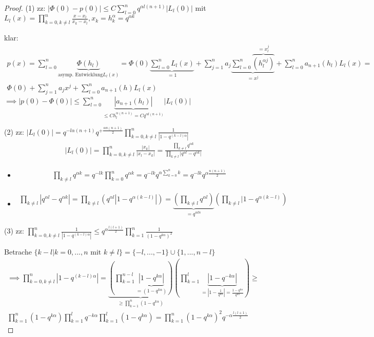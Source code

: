\begin{proof}
	(1) zz: $|\Phi(0) - p(0)| \leq C \sum_{l=0}^{n} q^{\alpha l (n+1)} |L_l(0)|$ mit $L_l(x) = \prod_{k=0, k\neq l}^{n} \frac{x-x_l}{x_k - x_l}, x_k = h_k^\alpha = q^{\alpha k}$
	
	klar:
	\begin{align*}
		p(x) = \sum_{l=0}^{n} \underbrace{\Phi(h_l)}_{\text{asymp. Entwicklung} L_l(x)} = \Phi(0) \underbrace{\sum_{l=0}^{n} L_l(x)}_{=1} + \sum_{j=1}^{n} a_j \underbrace{\sum_{l=0}^{n} \overbrace{(h_l^{\alpha j})}^{=x_l^j}}_{=x^j} + \sum_{l=0}^{n} a_{n+1}(h_l) L_l(x) =\\
		\Phi(0) + \sum_{j=1}^{n} a_j x^j + \sum_{l=0}^{n} a_{n+1}(h) L_l(x)
	\end{align*}
	$\implies |p(0) - \Phi(0)| \leq \sum_{l=0}^{n} \underbrace{|a_{n+1}(h_l)|}_{\leq C h_l^{\alpha (n+1)} = C q^{\alpha l (n+1)}} |L_l(0)|$
	
	(2) zz: $|L_l(0)| = q^{-l\alpha (n+1)} q^{+\frac{\alpha n(n+1)}{2}} \prod_{k=0, k\neq l}^n \frac{1}{|1-q^{(k-l)\alpha}|}$
	\begin{align*}
		|L_l(0)| = \prod_{k=0, k\neq l}^{n} \frac{|x_k|}{|x_l - x_k|} = \frac{\prod_{k\neq l} q^{\alpha k}}{\prod_{k\neq l} |q^{\alpha l} - q^{\alpha k}|}
	\end{align*}
	\begin{itemize}
		\item \begin{align*}
			\prod_{k\neq l} q^{\alpha k} = q^{-lk} \prod_{k=0}^{n} q^{\alpha k} = q^{-lk} q^{\alpha \sum_{k=0}^{n} k} = q^{-lk} q^{\alpha \frac{n(n+1)}{2}}
		\end{align*}
		\item \begin{align*}
			\prod_{k\neq l} |q^{\alpha l} - q^{\alpha k}| = \prod_{k\neq l} ( q^{\alpha l} |1- q^{\alpha (k-l)}|) = \underbrace{\left(\prod_{k\neq l} q^{\alpha l}\right)}_{= q^{\alpha l n}} \left(\prod_{k\neq l} |1- q^{\alpha(k-l)}\right)
		\end{align*}
	\end{itemize}
	
	(3) zz: $\prod_{k=0, k\neq l}^n \frac{1}{|1 - q^{(k-l)\alpha}|} \leq q^{\alpha \frac{l(l+1)}{2}} \prod_{k=1}^{n} \frac{1}{(1-q^{k\alpha})^2}$
	
	Betrache $\{k-l | k=0, ..., n \text{ mit } k\neq l\} = \{-l, ..., -1\} \cup \{1, ..., n-l\}$
	\begin{align*}
		\implies \prod_{k=0, k\neq l}^{n} |1-q^{(k-l)\alpha}| = \underbrace{\left(\prod_{k=1}^{n-l} \underbrace{|1-q^{k\alpha}|}_{=(1-q^{k\alpha})}\right)}_{\geq \prod_{k=1}^{n} (1-q^{k\alpha})} \left(\prod_{k=1}^{l} \underbrace{|1-q^{-k\alpha}|}_{=|1-\frac{1}{q^{k\alpha}}| = \frac{1-q^{k\alpha}}{q^{k\alpha}}}\right) \geq\\
		\prod_{k=1}^{n} (1-q^{k\alpha}) \prod_{k=1}^{l} q^{-k\alpha} \prod_{k=1}^{l} (1-q^{k\alpha}) = \prod_{k=1}^{n} (1-q^{k\alpha})^2 q^{-\alpha \frac{l(l+1)}{2}}
	\end{align*}
	

\end{proof}
